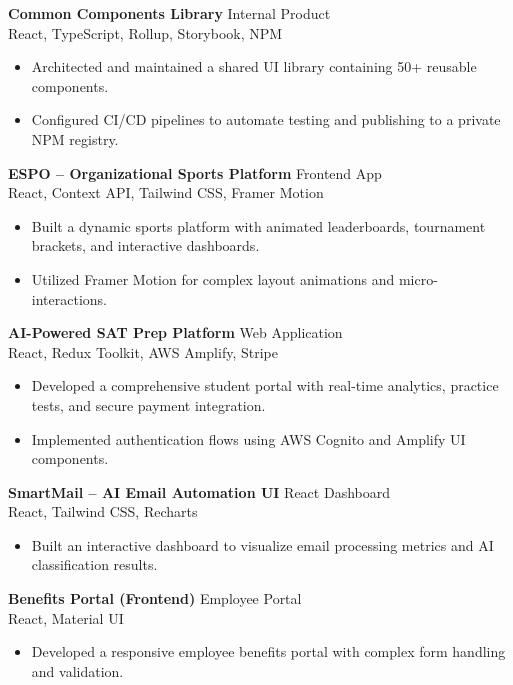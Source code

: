 \documentclass[11pt]{article}
\begin{document}
\textbf{Common Components Library} \hfill Internal Product \\
React, TypeScript, Rollup, Storybook, NPM
\begin{itemize}
    \item Architected and maintained a shared UI library containing 50+ reusable components.
    \item Configured CI/CD pipelines to automate testing and publishing to a private NPM registry.
\end{itemize}

\textbf{ESPO – Organizational Sports Platform} \hfill Frontend App \\
React, Context API, Tailwind CSS, Framer Motion
\begin{itemize}
    \item Built a dynamic sports platform with animated leaderboards, tournament brackets, and interactive dashboards.
    \item Utilized Framer Motion for complex layout animations and micro-interactions.
\end{itemize}

\textbf{AI-Powered SAT Prep Platform} \hfill Web Application \\
React, Redux Toolkit, AWS Amplify, Stripe
\begin{itemize}
    \item Developed a comprehensive student portal with real-time analytics, practice tests, and secure payment integration.
    \item Implemented authentication flows using AWS Cognito and Amplify UI components.
\end{itemize}

\textbf{SmartMail – AI Email Automation UI} \hfill React Dashboard \\
React, Tailwind CSS, Recharts
\begin{itemize}
    \item Built an interactive dashboard to visualize email processing metrics and AI classification results.
\end{itemize}

\textbf{Benefits Portal (Frontend)} \hfill Employee Portal \\
React, Material UI
\begin{itemize}
    \item Developed a responsive employee benefits portal with complex form handling and validation.
\end{itemize}
\end{document}
